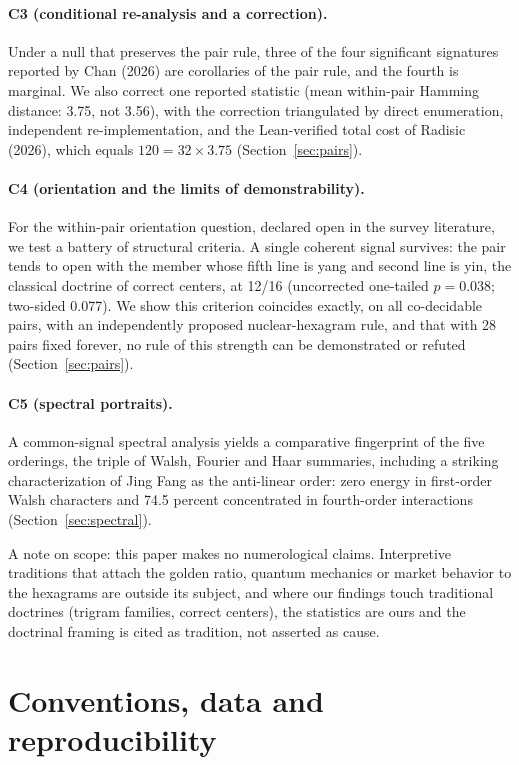\documentclass[11pt]{article}
\begin{document}
\paragraph{C3 (conditional re-analysis and a correction).} Under a null that preserves the pair rule, three of the four significant signatures reported by Chan (2026) are corollaries of the pair rule, and the fourth is marginal. We also correct one reported statistic (mean within-pair Hamming distance: 3.75, not 3.56), with the correction triangulated by direct enumeration, independent re-implementation, and the Lean-verified total cost of Radisic (2026), which equals $120 = 32 \times 3.75$ (Section~\ref{sec:pairs}).

\paragraph{C4 (orientation and the limits of demonstrability).} For the within-pair orientation question, declared open in the survey literature, we test a battery of structural criteria. A single coherent signal survives: the pair tends to open with the member whose fifth line is yang and second line is yin, the classical doctrine of correct centers, at 12/16 (uncorrected one-tailed $p = 0.038$; two-sided 0.077). We show this criterion coincides exactly, on all co-decidable pairs, with an independently proposed nuclear-hexagram rule, and that with 28 pairs fixed forever, no rule of this strength can be demonstrated or refuted (Section~\ref{sec:pairs}).

\paragraph{C5 (spectral portraits).} A common-signal spectral analysis yields a comparative fingerprint of the five orderings, the triple of Walsh, Fourier and Haar summaries, including a striking characterization of Jing Fang as the anti-linear order: zero energy in first-order Walsh characters and 74.5 percent concentrated in fourth-order interactions (Section~\ref{sec:spectral}).

A note on scope: this paper makes no numerological claims. Interpretive traditions that attach the golden ratio, quantum mechanics or market behavior to the hexagrams are outside its subject, and where our findings touch traditional doctrines (trigram families, correct centers), the statistics are ours and the doctrinal framing is cited as tradition, not asserted as cause.

\section{Conventions, data and reproducibility}
\end{document}
